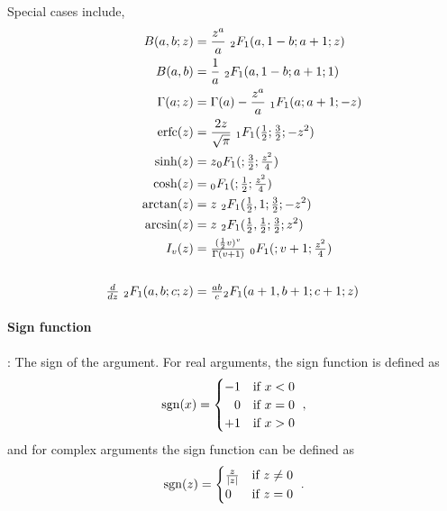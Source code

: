 Special cases include,
\begin{align*}
B(a,b;z) &= \frac{z^a}{a}\  {}_2 F_1(a,1-b;a+1;z						\checked) \\
B(a,b) &= \frac{1}{a}\ {}_2 F_1(a,1-b;a+1;1) 							\checked\\
\Gamma(a;z) &= \Gamma(a)- \frac{z^a}{a}\  {}_1 F_1(a; a+1;-z) 			\checked \\
\op{erfc}(z) & = \frac{2 z}{\sqrt{\pi} }\  {}_1 F_1(\tfrac{1}{2}; \tfrac{3}{2} ;-z^2)	\checked \\
 \sinh(z) & = z {}_0 F_1(; \tfrac{3}{2};\tfrac{z^2}{4} ) 						\checked \\		
 \cosh(z) & = {}_0 F_1(; \tfrac{1}{2};\tfrac{z^2}{4} ) 						\checked \\
\op{arctan}(z)& = z\ {}_2 F_1( \tfrac{1}{2},  1 ;  \tfrac{3}{2}; - z^2) 			\checked \\
\op{arcsin}(z)& = z\ {}_2 F_1( \tfrac{1}{2},  \tfrac{1}{2} ;  \tfrac{3}{2}; z^2) 	\checked \\
I_v(z) & = \sfrac{( \half v)^v}{\Gamma(v+1)}\ {}_0 F_1(; v+1;\tfrac{z^2}{4} ) \checked \\
\\
\tfrac{d}{dz}\ {}_2 F_1 (a,b;c;z) & = \tfrac{a b}{c} {}_2 F_1  (a+1,b+1;c+1;z) 	\checked
\end{align*}


\paragraph*{Sign function}\hspace{-0.8em}:
The sign of the argument. For real arguments, the sign function is defined as 
\begin{align*}	
 \operatorname{sgn}(x)  = \begin{cases}
-1 & \text{if } x < 0 \\
\phantom{+}0 & \text{if } x = 0 \\
+1 & \text{if } x > 0  \end{cases}	 \ , 
\end{align*}
and for complex arguments the sign function can be defined as
\begin{align*}	
 \operatorname{sgn}(z) = \begin{cases}
\tfrac{z}{|z|} & \text{if } z \neq 0 \\
0 & \text{if } z = 0
\end{cases}	\ .
\end{align*}


